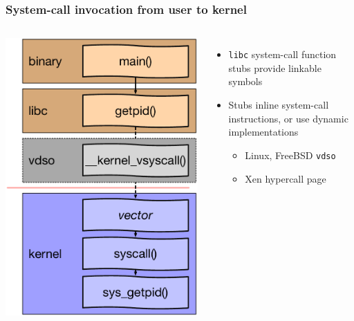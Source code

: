 \begin{frame}
  \frametitle{System-call invocation from user to kernel}

  \begin{columns}[T]
      \vspace{0.25cm}
      \includegraphics[width=\textwidth]{../../figures/syscall-stacks.pdf}

    \pause

      \begin{itemize}
	\item \texttt{libc} system-call function stubs provide linkable
	  symbols
	\item Stubs inline system-call instructions, or use dynamic
	  implementations
	\begin{itemize}
	  \item Linux, FreeBSD \texttt{vdso}
	  \item Xen hypercall page
	\end{itemize}


\end{itemize}
\end{columns}
\end{frame}
